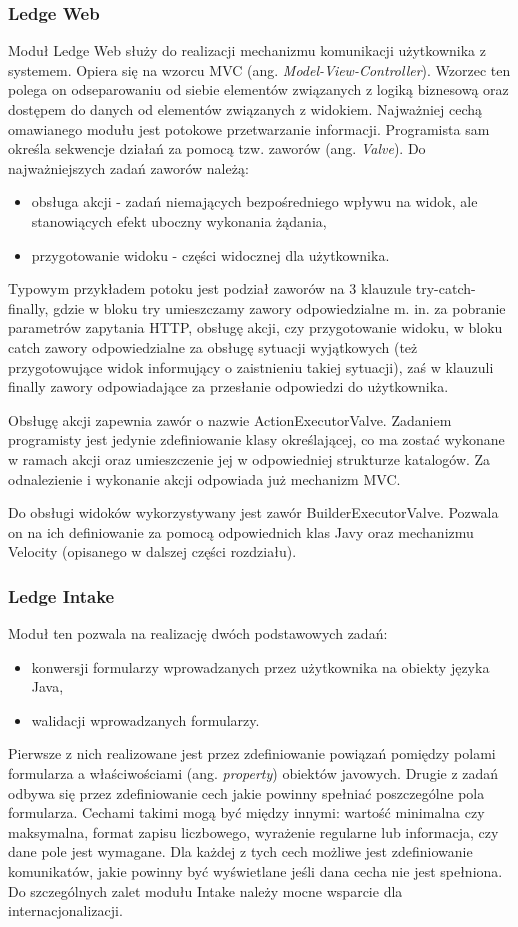 \subsubsection{Ledge Web}
Moduł Ledge Web służy do realizacji mechanizmu komunikacji użytkownika z systemem. Opiera się na wzorcu MVC (ang. \textit{Model-View-Controller}). Wzorzec ten polega on odseparowaniu od siebie elementów związanych z logiką biznesową oraz dostępem do danych od elementów związanych z widokiem. Najważniej cechą omawianego modułu jest potokowe przetwarzanie informacji. Programista sam określa sekwencje działań za pomocą tzw. zaworów (ang. \textit{Valve}). Do najważniejszych zadań zaworów należą:
\begin{itemize}
	\item obsługa akcji - zadań niemających bezpośredniego wpływu na widok, ale stanowiących efekt uboczny wykonania żądania,
	\item przygotowanie widoku - części widocznej dla użytkownika.
\end{itemize}
Typowym przykładem potoku jest podział zaworów na 3 klauzule try-catch-finally, gdzie w bloku try umieszczamy zawory odpowiedzialne m. in. za pobranie parametrów zapytania HTTP, obsługę akcji, czy przygotowanie widoku, w bloku catch zawory odpowiedzialne za obsługę sytuacji wyjątkowych (też przygotowujące widok informujący o zaistnieniu takiej sytuacji), zaś w klauzuli finally zawory odpowiadające za przesłanie odpowiedzi do użytkownika.

Obsługę akcji zapewnia zawór o nazwie ActionExecutorValve. Zadaniem programisty jest jedynie zdefiniowanie klasy określającej, co ma zostać wykonane w ramach akcji oraz umieszczenie jej w odpowiedniej strukturze katalogów. Za odnalezienie i wykonanie akcji odpowiada już mechanizm MVC.

Do obsługi widoków wykorzystywany jest zawór BuilderExecutorValve. Pozwala on na ich definiowanie za pomocą odpowiednich klas Javy oraz mechanizmu Velocity (opisanego w dalszej części rozdziału).

\subsubsection{Ledge Intake}
\label{intake}
Moduł ten pozwala na realizację dwóch podstawowych zadań:
\begin{itemize}
	\item konwersji formularzy wprowadzanych przez użytkownika na obiekty języka Java,
	\item walidacji wprowadzanych formularzy.
\end{itemize}
Pierwsze z nich realizowane jest przez zdefiniowanie powiązań pomiędzy polami formularza a właściwościami (ang. \textit{property}) obiektów javowych. Drugie z zadań odbywa się przez zdefiniowanie cech jakie powinny spełniać poszczególne pola formularza. Cechami takimi mogą być między innymi: wartość minimalna czy maksymalna,  format zapisu liczbowego, wyrażenie regularne lub informacja, czy dane pole jest wymagane. Dla każdej z tych cech możliwe jest zdefiniowanie komunikatów, jakie powinny być wyświetlane jeśli dana cecha nie jest spełniona. Do szczególnych zalet modułu Intake należy mocne wsparcie dla internacjonalizacji.

